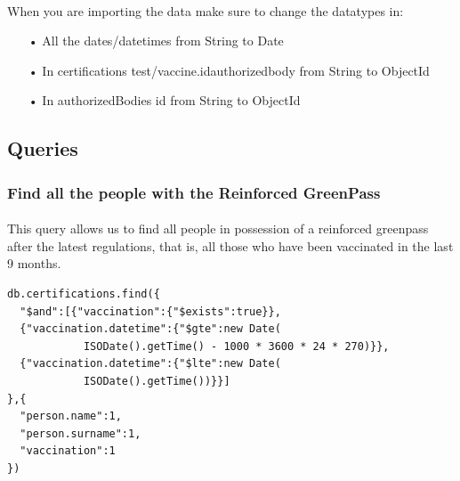 \documentclass[a4paper,12pt]{article}
\begin{document}
\paragraph{}When you are importing the data make sure to change the datatypes in:
\begin{itemize}
\item[•] All the dates/datetimes from String to Date
\item[•] In certifications test/vaccine.id\textunderscore authorized\textunderscore body from String to ObjectId
\item[•] In authorizedBodies \textunderscore id from String to ObjectId
\end{itemize}

\subsection{Queries}
\subsubsection{Find all the people with the Reinforced GreenPass}
\paragraph{} This query allows us to find all people in possession of a reinforced greenpass after the latest regulations, that is, all those who have been vaccinated in the last 9 months.
\begin{tcolorbox}[colback=green!5!white,colframe=green!75!black,title=QUERY]
\begin{verbatim}
db.certifications.find({
  "$and":[{"vaccination":{"$exists":true}},
  {"vaccination.datetime":{"$gte":new Date(
            ISODate().getTime() - 1000 * 3600 * 24 * 270)}},
  {"vaccination.datetime":{"$lte":new Date(
            ISODate().getTime())}}]
},{
  "person.name":1,
  "person.surname":1,
  "vaccination":1
})
\end{verbatim}
\end{tcolorbox}
\end{document}
